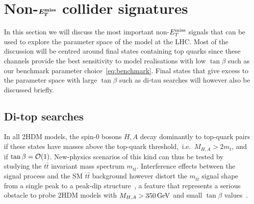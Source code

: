 \section{Non-$\mbox{\boldmath$E_T^{\rm miss}$\unboldmath}$ collider signatures}
\label{sec:nonMET}

In this section we will discuss the most important non-$E_T^\mathrm{miss}$ signals that can be used to explore the parameter space of the \hdma model at the LHC. Most of the discussion will be centred around final states containing top quarks since these channels provide the best sensitivity to model realisations with low $\tan \beta$ such as our benchmark parameter choice~\eqref{eq:benchmark}. Final states that give excess to the \hdma parameter space with large $\tan \beta$ such as di-tau searches will however also be discussed briefly. 

\subsection{Di-top  searches}
\label{sec:ttbarresonances}

In all 2HDM models, the spin-0 bosons $H,A$  decay dominantly to top-quark pairs if these states have masses above the top-quark threshold,~i.e.~$M_{H, A} > 2 m_t$, and if $\tan \beta = {\cal O}(1)$. New-physics scenarios of this kind can thus be tested by studying the $t \bar t$ invariant mass spectrum $m_{t \bar t}$.  Interference effects between the signal process and the SM  $t \bar t$ background however distort the $m_{t \bar t}$ signal shape from a single peak to a peak-dip structure~\cite{Gaemers:1984sj,Dicus:1994bm,Bernreuther:1997gs,Frederix:2007gi,Hespel:2016qaf}, a feature that represents a serious obstacle to probe 2HDM models with $M_{H,A} > 350 \, {\rm GeV}$ and small $\tan \beta$ values~\cite{Craig:2015jba,Hajer:2015gka,Gori:2016zto,Carena:2016npr}. 

